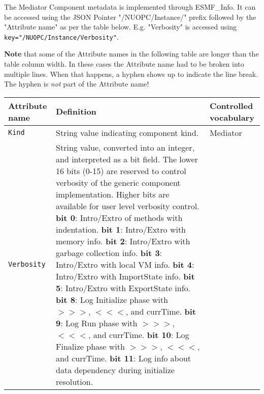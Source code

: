 \label{MediatorCompMeta}
The Mediator Component metadata is implemented through ESMF\_Info. It can be accessed
using the JSON Pointer "/NUOPC/Instance/" prefix followed by the "Attribute name"
as per the table below. E.g. "Verbosity" is accessed using {\tt key="/NUOPC/Instance/Verbosity"}.

{\bf Note} that some of the Attribute names in the following table are longer than the table column width. In these cases the
Attribute name had to be broken into multiple lines. When that happens, a hyphen shows up to indicate the line break. The hyphen
is {\em not} part of the Attribute name!

\begin{longtable}{|p{}|p{}|p{}|}
     \hline\hline
     {\bf Attribute name} & {\bf Definition} & {\bf Controlled vocabulary}\\
     \hline\hline
     {\tt Kind} & String value indicating component kind.& Mediator\\ \hline
     {\tt Verbosity} & String value, converted into an integer, and interpreted as a bit field. The lower 16 bits (0-15) are reserved to control verbosity of the generic component implementation. Higher bits are available for user level verbosity control. \newline
                       {\bf bit 0}: Intro/Extro of methods with indentation.\newline
                       {\bf bit 1}: Intro/Extro with memory info.\newline
                       {\bf bit 2}: Intro/Extro with garbage collection info.\newline
                       {\bf bit 3}: Intro/Extro with local VM info.\newline
                       {\bf bit 4}: Intro/Extro with ImportState info.\newline
                       {\bf bit 5}: Intro/Extro with ExportState info.\newline
                       {\bf bit 8}: Log Initialize phase with $>>>$, $<<<$, and currTime.\newline
                       {\bf bit 9}: Log Run phase with $>>>$, $<<<$, and currTime.\newline
                       {\bf bit 10}: Log Finalize phase with $>>>$, $<<<$, and currTime.\newline
                       {\bf bit 11}: Log info about data dependency during initialize resolution.\newline

\end{longtable}
